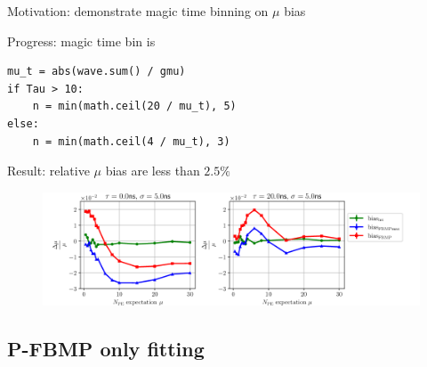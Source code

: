 \documentclass[notitlepage]{article}
\begin{document}
Motivation: demonstrate magic time binning on $\mu$ bias

Progress: magic time bin is
\begin{lstlisting}
mu_t = abs(wave.sum() / gmu)
if Tau > 10:
    n = min(math.ceil(20 / mu_t), 5)
else:
    n = min(math.ceil(4 / mu_t), 3)
\end{lstlisting}

Result: relative $\mu$ bias are less than $2.5\%$

\begin{figure}[H]
    \centering
    \includegraphics[width=\textwidth]{vs-biasmu-magic.png}
\end{figure}

\subsection{P-FBMP only fitting}
\end{document}
